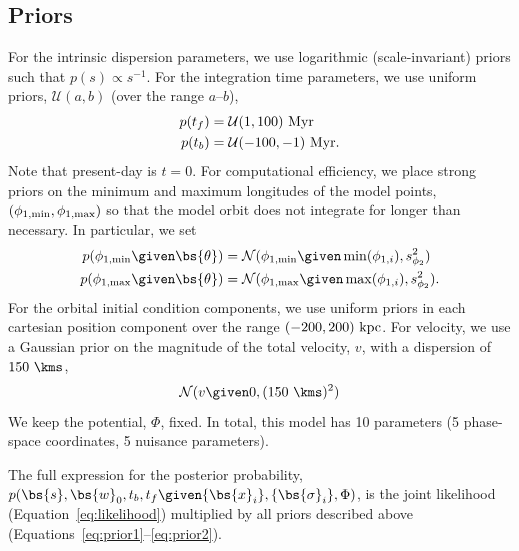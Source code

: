 \documentclass[letterpaper,12pt,preprint]{aastex}
\newcommand{\norm}{\mathcal{N}}
\begin{document}
\subsection{Priors}

For the intrinsic dispersion parameters, we use logarithmic (scale-invariant) priors such that $p(s) \propto s^{-1}$. For the integration time parameters, we use uniform priors, $\mathcal{U}(a,b)$ (over the range $a$--$b$),
\begin{align}
	p(t_f) &= \mathcal{U}(1,100)~{\rm Myr}\label{eq:prior1}\\
	p(t_b) &= \mathcal{U}(-100,-1)~{\rm Myr}.
\end{align}
Note that present-day is $t=0$. For computational efficiency, we place strong priors on the minimum and maximum longitudes of the model points, $(\phi_{1,{\rm min}},\phi_{1,{\rm max}})$ so that the model orbit does not integrate for longer than necessary. In particular, we set
\begin{align}
	p(\phi_{1,{\rm min}} \given \bs{\theta}) &= \norm(\phi_{1,{\rm min}} \given \min(\phi_{1,i}), s^2_{\phi_2})\\
	p(\phi_{1,{\rm max}} \given \bs{\theta}) &= \norm(\phi_{1,{\rm max}} \given \max(\phi_{1,i}), s^2_{\phi_2}).
\end{align}
For the orbital initial condition components, we use uniform priors in each cartesian position component over the range $(-200,200)~{\rm kpc}$. For velocity, we use a Gaussian prior on the magnitude of the total velocity, $v$, with a dispersion of $150~\kms$,
\begin{equation}
	\norm(v \given 0, (150~\kms)^2) \label{eq:prior2}
\end{equation}
We keep the potential, $\Phi$, fixed. In total, this model has 10 parameters (5 phase-space coordinates, 5 nuisance parameters).

The full expression for the posterior probability, $p(\bs{s}, \bs{w}_0, t_b, t_f \given \{\bs{x}_i\}, \{\bs{\sigma}_i\}, \Phi)$, is the joint likelihood (Equation~\ref{eq:likelihood}) multiplied by all priors described above (Equations~\ref{eq:prior1}--\ref{eq:prior2}).
\end{document}
